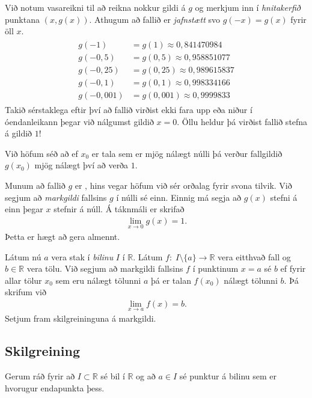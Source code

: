 \documentclass[a4paper,10pt,icelandic]{sphinxmanual}
\begin{document}
Við notum vasareikni til að reikna nokkur gildi á \(g\) og merkjum inn í \textit{hnitakerfið} punktana \((x,g(x))\).
Athugum að fallið er \textit{jafnstætt} svo \(g(-x)=g(x)\) fyrir öll \(x\).
\begin{equation*}
\begin{split}\begin{aligned}
    g(-1) &=g(1) \approx 0,841470984 \\
    g(-0,5) &=g(0,5)\approx 0,958851077\\
    g(-0,25) &=g(0,25)\approx 0,989615837 \\
    g(-0,1) &=g(0,1)\approx 0,998334166 \\
    g(-0,001) &= g(0,001) \approx 0,9999833
\end{aligned}\end{split}
\end{equation*}
Takið sérstaklega eftir því að fallið virðist ekki fara upp eða niður í óendanleikann þegar við nálgumst gildið \(x=0\).
Öllu heldur þá virðist fallið stefna á gildið \(1\)!

Við höfum séð að ef \(x_0\) er tala sem er mjög nálægt núlli þá verður fallgildið \(g(x_0)\) mjög nálægt því að verða \(1\).

Munum að fallið \(g\) er , hins vegar höfum við sér orðalag fyrir svona tilvik.
Við segjum að \textit{markgildi} fallsins \(g\) í núlli sé einn.
Einnig má segja að \(g(x)\) stefni á einn þegar \(x\) stefnir á núll.
Á táknmáli er skrifað
\begin{equation*}
\begin{split}\lim_{x\to 0}g(x)=1.\end{split}
\end{equation*}
Þetta er hægt að gera almennt.

Látum nú \(a\) vera stak í \textit{bilinu} \(I\) í \(\mathbb{R}\).
Látum \(f:\;I\setminus\{a\}\to \mathbb{R}\) vera eitthvað fall og \(b\in \mathbb{R}\) vera tölu.
Við segjum að markgildi fallsins \(f\) í punktinum \(x=a\) sé \(b\) ef fyrir allar tölur \(x_0\) sem eru nálægt tölunni \(a\) þá er talan \(f(x_0)\) nálægt tölunni \(b\).
Þá skrifum við
\begin{equation*}
\begin{split}\lim_{x\to a}f(x)=b.\end{split}
\end{equation*}
Setjum fram skilgreininguna á markgildi.


\subsection{Skilgreining}
\label{\detokenize{Kafli10:skilgreining}}
Gerum ráð fyrir að \(I\subset \mathbb{R}\) sé bil í \(\mathbb{R}\) og að \(a\in I\) sé punktur á bilinu sem er hvorugur endapunkta þess.
\end{document}
